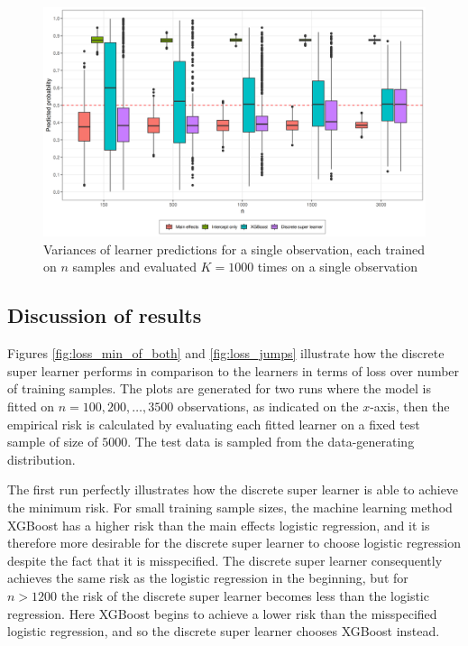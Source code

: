 \documentclass[11pt, a4paper]{article}
\theoremstyle{definition}
\theoremstyle{remark}
\begin{document}
\begin{figure}[H]
    \centering
    \includegraphics[width=\textwidth]{figures/learner_vars.png}
    \caption{Variances of learner predictions for a single observation, each trained on $n $ samples and evaluated $ K = 1000 $ times on a single observation}
    \label{fig:pred_probs_boxplot}
\end{figure}

\subsection{Discussion of results}
Figures \ref{fig:loss_min_of_both} and \ref{fig:loss_jumps} illustrate how the discrete super learner performs in comparison to the learners in terms of loss over number of training samples. The plots are generated for two runs where the model is fitted on $ n = 100, 200, \dots , 3500 $ observations, as indicated on the $ x $-axis, then the empirical risk is calculated by evaluating each fitted learner on a fixed test sample of size of $ 5000 $. The test data is sampled from the data-generating distribution.  

The first run perfectly illustrates how the discrete super learner is able to achieve the minimum risk. For small training sample sizes, the machine learning method XGBoost has a higher risk than the main effects logistic regression, and it is therefore more desirable for the discrete super learner to choose logistic regression despite the fact that it is misspecified. The discrete super learner consequently achieves the same risk as the logistic regression in the beginning, but for $ n > 1200 $ the risk of the discrete super learner becomes less than the logistic regression. Here XGBoost begins to achieve a lower risk than the misspecified logistic regression, and so the discrete super learner chooses XGBoost instead. 
\end{document}
